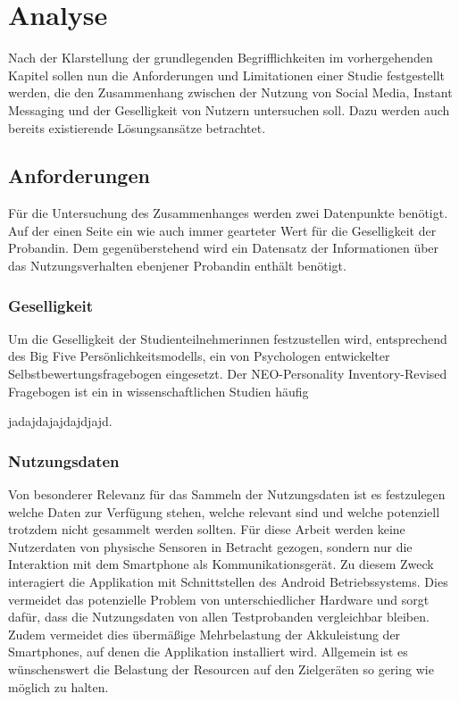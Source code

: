 
\chapter{Analyse}
\label{ch:Analyse}

Nach der Klarstellung der grundlegenden Begrifflichkeiten im vorhergehenden Kapitel
sollen nun die Anforderungen und Limitationen einer Studie festgestellt werden, die den
Zusammenhang zwischen der Nutzung von Social Media, Instant Messaging und der Geselligkeit
von Nutzern untersuchen soll. 
Dazu werden auch bereits existierende Lösungsansätze betrachtet. 

\section{Anforderungen}
\label{ch:Analyse:sec:Anforderungen}


Für die Untersuchung des Zusammenhanges werden zwei Datenpunkte benötigt.
Auf der einen Seite ein wie auch immer gearteter Wert für die Geselligkeit der Probandin. 
Dem gegenüberstehend wird ein Datensatz der Informationen über das Nutzungsverhalten ebenjener Probandin enthält benötigt.
\par

\subsection{Geselligkeit}

Um die Geselligkeit der Studienteilnehmerinnen festzustellen wird, entsprechend des Big Five Persönlichkeitsmodells, ein von Psychologen entwickelter Selbstbewertungsfragebogen eingesetzt.
Der NEO-Personality Inventory-Revised Fragebogen ist ein in wissenschaftlichen Studien häufig

jadajdajajdajdjajd.

\subsection{Nutzungsdaten}

Von besonderer Relevanz für das Sammeln der Nutzungsdaten ist es festzulegen welche Daten zur Verfügung stehen, welche relevant sind und welche potenziell trotzdem nicht gesammelt werden sollten.
Für diese Arbeit werden keine Nutzerdaten von physische Sensoren in Betracht gezogen, sondern nur die Interaktion mit dem Smartphone als Kommunikationsgerät.
Zu diesem Zweck interagiert die Applikation mit Schnittstellen des Android Betriebssystems.
Dies vermeidet das potenzielle Problem von unterschiedlicher Hardware und sorgt dafür, dass die Nutzungsdaten von allen Testprobanden vergleichbar bleiben.
Zudem vermeidet dies übermäßige Mehrbelastung der Akkuleistung der Smartphones, auf denen die Applikation installiert wird.
Allgemein ist es wünschenswert die Belastung der Resourcen auf den Zielgeräten so gering wie möglich zu halten.
\par

